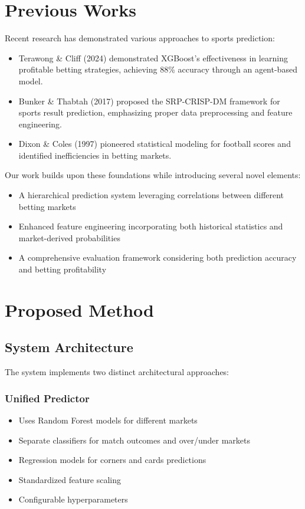 \documentclass[conference]{IEEEtran}
\begin{document}
\section{Previous Works}
Recent research has demonstrated various approaches to sports prediction:

\begin{itemize}
    \item Terawong \& Cliff (2024) demonstrated XGBoost's effectiveness in learning profitable betting strategies, achieving 88\% accuracy through an agent-based model.
    \item Bunker \& Thabtah (2017) proposed the SRP-CRISP-DM framework for sports result prediction, emphasizing proper data preprocessing and feature engineering.
    \item Dixon \& Coles (1997) pioneered statistical modeling for football scores and identified inefficiencies in betting markets.
\end{itemize}

Our work builds upon these foundations while introducing several novel elements:
\begin{itemize}
    \item A hierarchical prediction system leveraging correlations between different betting markets
    \item Enhanced feature engineering incorporating both historical statistics and market-derived probabilities
    \item A comprehensive evaluation framework considering both prediction accuracy and betting profitability
\end{itemize}

\section{Proposed Method}

\subsection{System Architecture}
The system implements two distinct architectural approaches:

\subsubsection{Unified Predictor}
\begin{itemize}
    \item Uses Random Forest models for different markets
    \item Separate classifiers for match outcomes and over/under markets
    \item Regression models for corners and cards predictions
    \item Standardized feature scaling
    \item Configurable hyperparameters
\end{itemize}
\end{document}
